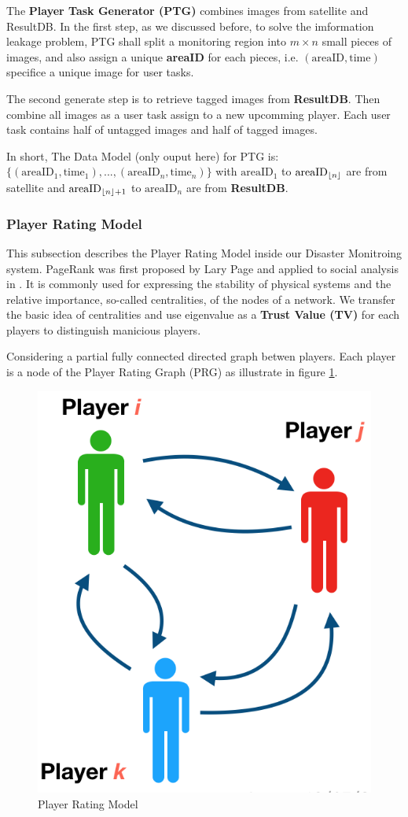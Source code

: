   The \textbf{Player Task Generator (PTG)} combines images from satellite and ResultDB. 
  In the first step, as we discussed before, to solve the imformation leakage problem,
  PTG shall split a monitoring region into $m\times n$ small pieces of images, and also assign a 
  unique \textbf{areaID} for each pieces, i.e. $(\text{areaID}, \text{time})$ 
  specifice a unique image for user tasks. 

  The second generate step is to retrieve tagged images from \textbf{ResultDB}. Then combine
  all images as a user task assign to a new upcomming player. Each user task contains 
  half of untagged images and half of tagged images.

  In short, The Data Model (only ouput here) for PTG is:
  $\{(\text{areaID}_1, \text{time}_1), ..., (\text{areaID}_n, \text{time}_n)\}$
  with $\text{areaID}_1$ to $\text{areaID}_{\lfloor n\rfloor}$ are from satellite and 
  $\text{areaID}_{\lfloor n\rfloor+1}$ to $\text{areaID}_{n}$ are from \textbf{ResultDB}.

\subsubsection{Player Rating Model}

  This subsection describes the Player Rating Model inside our Disaster Monitroing system.
  PageRank was first proposed by Lary Page \cite{page1999pagerank} and applied to social analysis in \cite{bonacich2001eigenvector}. 
  It is commonly used for expressing the stability of physical systems and the relative importance, 
  so-called centralities, of the nodes of a network. We transfer the basic idea of centralities 
  and use eigenvalue as a \textbf{Trust Value (TV)} for each players to distinguish manicious players.

  Considering a partial fully connected directed graph betwen players. 
  Each player is a node of the Player Rating Graph (PRG) as illustrate in figure \ref{fig:graph}.

  \begin{figure}[htp]
  \centering
  \includegraphics[width=0.3\columnwidth]{figures/graph}
  \caption{Player Rating Model}
  \label{fig:graph}
  \end{figure}
  
